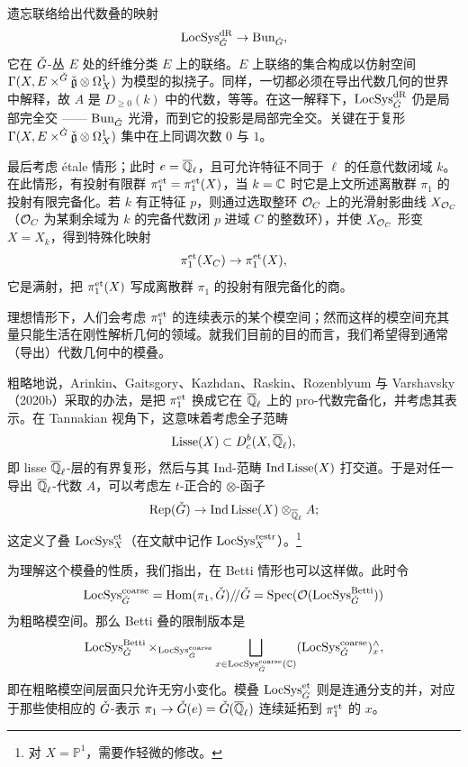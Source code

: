 遗忘联络给出代数叠的映射
\[
\LocSys^{\dR}_{\Gd}\to\Bun_{\Gd},
\]
它在 $\Gd$-丛 $E$ 处的纤维分类 $E$ 上的联络。$E$ 上联络的集合构成以仿射空间 $\Gamma(X,E\times^{\Gd}\check{\gc}\otimes\OmX)$ 为模型的拟挠子。同样，一切都必须在导出代数几何的世界中解释，故 $A$ 是 $D_{\ge 0}(k)$ 中的代数，等等。在这一解释下，$\LocSys^{\dR}_{\Gd}$ 仍是局部完全交 —— $\Bun_{\Gd}$ 光滑，而到它的投影是局部完全交。关键在于复形 $\Gamma(X,E\times^{\Gd}\check{\gc}\otimes\OmX)$ 集中在上同调次数 $0$ 与 $1$。

最后考虑 étale 情形；此时 $e=\Ql$，且可允许特征不同于 $\ell$ 的任意代数闭域 $k$。在此情形，有投射有限群 $\pi_1^{\et}=\pi_1^{\et}(X)$，当 $k=\C$ 时它是上文所述离散群 $\pi_1$ 的投射有限完备化。若 $k$ 有正特征 $p$，则通过选取整环 $\cO_C$ 上的光滑射影曲线 $X_{\cO_C}$（$\cO_C$ 为某剩余域为 $k$ 的完备代数闭 $p$ 进域 $C$ 的整数环），并使 $X_{\cO_C}$ 形变 $X=X_k$，得到特殊化映射
\[
\pi_1^{\et}(X_C)\to\pi_1^{\et}(X),
\]
它是满射，把 $\pi_1^{\et}(X)$ 写成离散群 $\pi_1$ 的投射有限完备化的商。

理想情形下，人们会考虑 $\pi_1^{\et}$ 的连续表示的某个模空间；然而这样的模空间充其量只能生活在刚性解析几何的领域。就我们目前的目的而言，我们希望得到通常（导出）代数几何中的模叠。

粗略地说，Arinkin、Gaitsgory、Kazhdan、Raskin、Rozenblyum 与 Varshavsky（2020b）采取的办法，是把 $\pi_1^{\et}$ 换成它在 $\Ql$ 上的 pro-代数完备化，并考虑其表示。在 Tannakian 视角下，这意味着考虑全子范畴
\[
\Lisse(X)\subset D^b_c(X,\Ql),
\]
即 lisse $\Ql$-层的有界复形，然后与其 Ind-范畴 $\Ind\Lisse(X)$ 打交道。于是对任一导出 $\Ql$-代数 $A$，可以考虑左 $t$-正合的 $\otimes$-函子
\[
\Rep(\Gd)\to\Ind\Lisse(X)\otimes_{\Ql}A;
\]
这定义了叠 $\LocSys^{\et}_X$（在文献中记作 $\LocSys^{\restr}_X$）。\footnote{对 $X=\mathbb{P}^1$，需要作轻微的修改。}

为理解这个模叠的性质，我们指出，在 Betti 情形也可以这样做。此时令
\[
\LocSys^{\coarse}_{\Gd}=\Hom(\pi_1,\Gd)/\!/\Gd=\Spec(\cO(\LocSys^{\Betti}_{\Gd}))
\]
为粗略模空间。那么 Betti 叠的限制版本是
\[
\LocSys^{\Betti}_{\Gd}\times_{\LocSys^{\coarse}_{\Gd}}\bigsqcup_{x\in\LocSys^{\coarse}_{\Gd}(\C)}(\LocSys^{\coarse}_{\Gd})^{\wedge}_{x},
\]
即在粗略模空间层面只允许无穷小变化。模叠 $\LocSys^{\et}_{\Gd}$ 则是连通分支的并，对应于那些使相应的 $\Gd$-表示 $\pi_1\to\Gd(e)=\Gd(\Ql)$ 连续延拓到 $\pi_1^{\et}$ 的 $x$。
